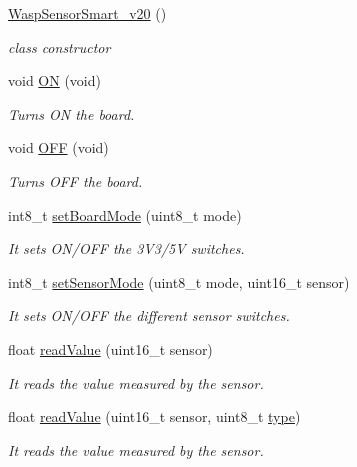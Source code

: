 \begin{DoxyCompactItemize}
\item 
\hyperlink{class_wasp_sensor_smart__v20_a9136cd71d6dd0e02e353b50a1f2b1f4b}{Wasp\+Sensor\+Smart\+\_\+v20} ()
\begin{DoxyCompactList}\small\item\em class constructor \end{DoxyCompactList}\item 
void \hyperlink{class_wasp_sensor_smart__v20_a6c80267ecba68fb4e33e3ba572896d8f}{ON} (void)
\begin{DoxyCompactList}\small\item\em Turns ON the board. \end{DoxyCompactList}\item 
void \hyperlink{class_wasp_sensor_smart__v20_acfde466975945b339c545ad3d6170cc1}{O\+FF} (void)
\begin{DoxyCompactList}\small\item\em Turns O\+FF the board. \end{DoxyCompactList}\item 
int8\+\_\+t \hyperlink{class_wasp_sensor_smart__v20_abb9b88c67df0b1794681cce95bec94de}{set\+Board\+Mode} (uint8\+\_\+t mode)
\begin{DoxyCompactList}\small\item\em It sets O\+N/\+O\+FF the 3\+V3/5V switches. \end{DoxyCompactList}\item 
int8\+\_\+t \hyperlink{class_wasp_sensor_smart__v20_a1766a78484a3a23b729995f08cc03f74}{set\+Sensor\+Mode} (uint8\+\_\+t mode, uint16\+\_\+t sensor)
\begin{DoxyCompactList}\small\item\em It sets O\+N/\+O\+FF the different sensor switches. \end{DoxyCompactList}\item 
float \hyperlink{class_wasp_sensor_smart__v20_a9d955b3290f181b7c676d499ab8ab76e}{read\+Value} (uint16\+\_\+t sensor)
\begin{DoxyCompactList}\small\item\em It reads the value measured by the sensor. \end{DoxyCompactList}\item 
float \hyperlink{class_wasp_sensor_smart__v20_a5eef637e766f5d9e5340fe26fd869afa}{read\+Value} (uint16\+\_\+t sensor, uint8\+\_\+t \hyperlink{_sd_fat_structs_8h_a1d127017fb298b889f4ba24752d08b8e}{type})
\begin{DoxyCompactList}\small\item\em It reads the value measured by the sensor. \end{DoxyCompactList}\end{DoxyCompactItemize}


